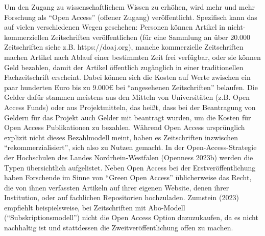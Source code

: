 \documentclass[
  letterpaper,
  DIV=11,
  numbers=noendperiod]{scrreprt}
\begin{document}
Um den Zugang zu wissenschaftlichem Wissen zu erhöhen, wird mehr und
mehr Forschung als ``Open Access'' (offener Zugang) veröffentlicht.
Spezifisch kann das auf vielen verschiedenen Wegen geschehen: Personen
können Artikel in nicht-kommerziellen Zeitschriften veröffentlichen (für
eine Sammlung an über 20.000 Zeitschriften siehe z.B. https://doaj.org),
manche kommerzielle Zeitschriften machen Artikel nach Ablauf einer
bestimmten Zeit frei verfügbar, oder sie können Geld bezahlen, damit der
Artikel öffentlich zugänglich in einer traditionellen Fachzeitschrift
erscheint. Dabei können sich die Kosten auf Werte zwischen ein paar
hunderten Euro bis zu 9.000€ bei ``angesehenen Zeitschriften'' belaufen.
Die Gelder dafür stammen meistens aus den Mitteln von Universitäten
(z.B. Open Access Funds) oder aus Projektmitteln, das heißt, dass bei
der Beantragung von Geldern für das Projekt auch Gelder mit beantragt
wurden, um die Kosten für Open Access Publikationen zu bezahlen. Während
Open Access ursprünglich explizit nicht dieses Bezahlmodell meint, haben
es Zeitschriften inzwischen ``rekommerzialisiert'', sich also zu Nutzen
gemacht. In der Open-Access-Strategie der Hochschulen des Landes
Nordrhein-Westfalen (Openness 2023b) werden die Typen übersichtlich
aufgelistet. Neben Open Access bei der Erstveröffentlichung haben
Forschende im Sinne von ``Green Open Access'' üblicherweise das Recht,
die von ihnen verfassten Artikeln auf ihrer eigenen Website, denen ihrer
Institution, oder auf fachlichen Repositorien hochzuladen. Zumstein
(2023) empfiehlt beispielsweise, bei Zeitschriften mit Abo-Modell
(``Subskriptionsmodell'') nicht die Open Access Option dazuzukaufen, da
es nicht nachhaltig ist und stattdessen die Zweitveröffentlichung offen
zu machen.
\end{document}
